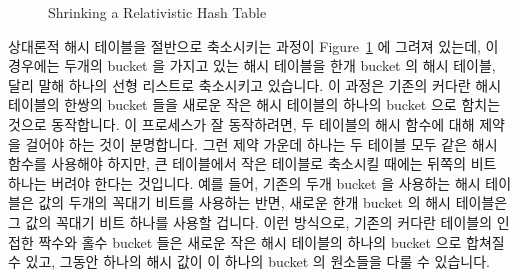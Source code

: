 \begin{figure}[tb]
\centering
{}
\caption{Shrinking a Relativistic Hash Table}
\label{fig:datastruct:Shrinking a Relativistic Hash Table}
\end{figure}

상대론적 해시 테이블을 절반으로 축소시키는 과정이
Figure~\ref{fig:datastruct:Shrinking a Relativistic Hash Table} 에 그려져
있는데, 이 경우에는 두개의 bucket 을 가지고 있는 해시 테이블을 한개 bucket 의
해시 테이블, 달리 말해 하나의 선형 리스트로 축소시키고 있습니다.
이 과정은 기존의 커다란 해시 테이블의 한쌍의 bucket 들을 새로운 작은 해시
테이블의 하나의 bucket 으로 함치는 것으로 동작합니다.
이 프로세스가 잘 동작하려면, 두 테이블의 해시 함수에 대해 제약을 걸어야 하는
것이 분명합니다.
그런 제약 가운데 하나는 두 테이블 모두 같은 해시 함수를 사용해야 하지만, 큰
테이블에서 작은 테이블로 축소시킬 때에는 뒤쪽의 비트 하나는 버려야 한다는
것입니다.
예를 들어, 기존의 두개 bucket 을 사용하는 해시 테이블은 값의 두개의 꼭대기
비트를 사용하는 반면, 새로운 한개 bucket 의 해시 테이블은 그 값의 꼭대기 비트
하나를 사용할 겁니다.
이런 방식으로, 기존의 커다란 테이블의 인접한 짝수와 홀수 bucket 들은 새로운
작은 해시 테이블의 하나의 bucket 으로 합쳐질 수 있고, 그동안 하나의 해시 값이
이 하나의 bucket 의 원소들을 다룰 수 있습니다.
\iffalse

